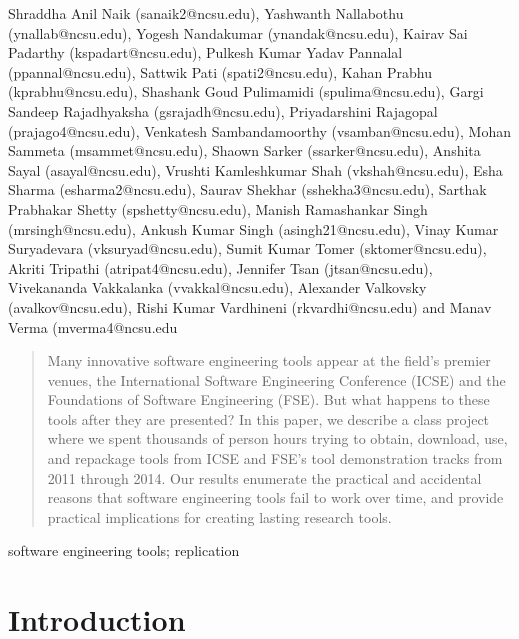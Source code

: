 \documentclass[10pt,conference]{IEEEtran}
\begin{document}
{{Shraddha Anil Naik ({sanaik2@ncsu.edu}),
Yashwanth Nallabothu ({ynallab@ncsu.edu}),
Yogesh Nandakumar ({ynandak@ncsu.edu}),
Kairav Sai Padarthy ({kspadart@ncsu.edu}),
Pulkesh Kumar Yadav Pannalal ({ppannal@ncsu.edu}),
Sattwik Pati ({spati2@ncsu.edu}),
Kahan Prabhu ({kprabhu@ncsu.edu}),
Shashank Goud Pulimamidi ({spulima@ncsu.edu}),
Gargi Sandeep Rajadhyaksha ({gsrajadh@ncsu.edu}),
Priyadarshini Rajagopal ({prajago4@ncsu.edu}),
Venkatesh Sambandamoorthy ({vsamban@ncsu.edu}),
Mohan Sammeta ({msammet@ncsu.edu}),
Shaown Sarker ({ssarker@ncsu.edu}),
Anshita Sayal ({asayal@ncsu.edu}),
Vrushti Kamleshkumar Shah ({vkshah@ncsu.edu}),
Esha Sharma ({esharma2@ncsu.edu}),
Saurav Shekhar ({sshekha3@ncsu.edu}),
Sarthak Prabhakar Shetty ({spshetty@ncsu.edu}),
Manish Ramashankar Singh ({mrsingh@ncsu.edu}),
Ankush Kumar Singh ({asingh21@ncsu.edu}),
Vinay Kumar Suryadevara ({vksuryad@ncsu.edu}),
Sumit Kumar Tomer ({sktomer@ncsu.edu}),
Akriti Tripathi ({atripat4@ncsu.edu}),
Jennifer Tsan ({jtsan@ncsu.edu}),
Vivekananda Vakkalanka ({vvakkal@ncsu.edu}),
Alexander Valkovsky ({avalkov@ncsu.edu}),
Rishi Kumar Vardhineni ({rkvardhi@ncsu.edu}) and
Manav Verma ({mverma4@ncsu.edu}
}}

\maketitle
\begin{abstract}
Many innovative software engineering tools appear at the field's premier venues, the 
International Software Engineering Conference (ICSE) and the 
Foundations of Software Engineering (FSE).
But what happens to these tools after they are presented?
In this paper, we describe a class project where we spent 
thousands of person hours
trying to obtain, download, use, and repackage \totalToolsTried
tools from ICSE and FSE's tool demonstration tracks from
2011 through 2014.
Our results enumerate the practical and accidental reasons that
software engineering tools fail to work over time,
and provide practical implications for creating lasting 
research tools.
\end{abstract}

\begin{IEEEkeywords}
software engineering tools; replication
\end{IEEEkeywords}

\section{Introduction}
\end{document}
